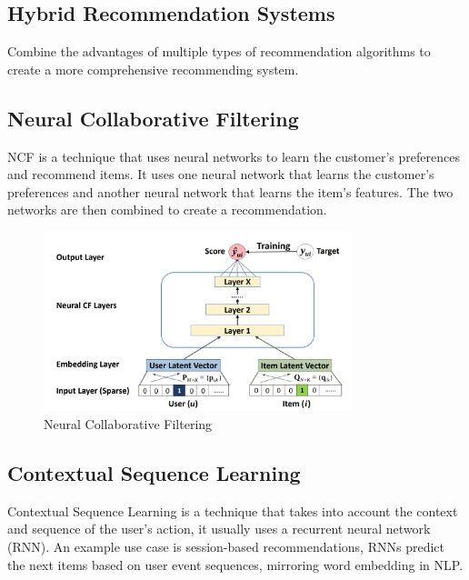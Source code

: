\subsection{Hybrid Recommendation Systems}
Combine the advantages of multiple types of recommendation algorithms to create a more comprehensive recommending system.
\subsection{Neural Collaborative Filtering}
NCF is a technique that uses neural networks to learn the customer's preferences and recommend items. It uses one neural network that learns the customer's preferences and another neural network that learns the item's features. The two networks are then combined to create a recommendation.
\begin{figure}[H]
    \centering
    \includegraphics[width=0.8\textwidth]{assets/neural-collaborative-filtering.png}
    \caption[Neural Collaborative Filtering]{Neural Collaborative Filtering \cite{NvidiaRecSys}}
    \label{fig:neural-collaborative-filtering}
\end{figure}

\subsection{Contextual Sequence Learning}
Contextual Sequence Learning is a technique that takes into account the context and sequence of the user's action, it usually uses a recurrent neural network (RNN).
An example use case is session-based recommendations, RNNs predict the next items based on user event sequences, mirroring word embedding in NLP.
